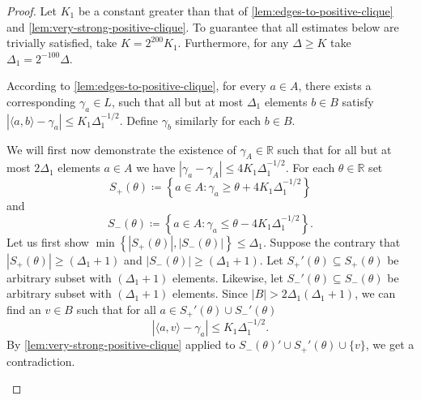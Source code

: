\documentclass[reqno, 11pt]{amsart}
\theoremstyle{definition}
\theoremstyle{remark}
\newcommand{\set}[1]{\left\{ #1 \right\}}
\newcommand{\RR}{\mathbb{R}}
\begin{document}
\begin{proof}
Let $K_1$ be a constant greater than that of \cref{lem:edges-to-positive-clique} and \cref{lem:very-strong-positive-clique}. To guarantee that all estimates below are trivially satisfied, take $K = 2^{200}K_1$. Furthermore, for any $\Delta \geq K$ take $\Delta_1 = 2^{-100}\Delta$. 

According to \cref{lem:edges-to-positive-clique}, for every $a \in A$, there exists a corresponding $\gamma_a \in L$, such that all but at most $\Delta_1$ elements $b \in B$ satisfy $|\langle a, b \rangle - \gamma_a | \leq K_1\Delta_1^{-1/2}$. Define  $\gamma_b$ similarly for each $b \in B$.

We will first now demonstrate the existence of $\gamma_A \in \RR$ such that for all but at most $2\Delta_1$ elements $a \in A$ we have
$|\gamma_a - \gamma_A| \leq 4K_1\Delta_1^{-1/2}$. For each $\theta \in \RR$ set 	
\[
		S_+(\theta) \coloneqq \left\{a \in A : \gamma_a \geq \theta+ 4K_1\Delta_1^{-1/2}\right\}
  \]
  and
  \[
		S_-(\theta) \coloneqq\left\{a \in A : \gamma_a \leq \theta-  4K_1\Delta_1^{-1/2}\right\}.
\]
Let us first show $\min\set{|S_+(\theta)|, |S_-(\theta)|} \leq  \Delta_1$. Suppose the contrary that $|S_+(\theta)| \geq (\Delta_1 + 1)$ and $|S_-(\theta)| \geq  (\Delta_1 +1)$. Let $S_+'(\theta) \subseteq S_+(\theta)$ be arbitrary subset with $(\Delta_1 + 1)$ elements. Likewise, let $S_-'(\theta) \subseteq S_-(\theta)$ be arbitrary subset with $(\Delta_1 + 1)$ elements. Since $|B| > 2\Delta_1(\Delta_1+1)$, we can find an $v \in B$ such that for all $a \in S_+'(\theta) \cup S_-'(\theta)$ 
\[
		|\langle a,v \rangle -\gamma_{a}| \leq K_1\Delta_1^{-1/2}.
\]
By \cref{lem:very-strong-positive-clique} applied to $S_-(\theta)' \cup S_+'(\theta) \cup \{v\}$, we get a contradiction.


\begin{figure}[h]\label{fig:two-positive-cliques-1}
\end{figure}
\end{proof}
\end{document}
